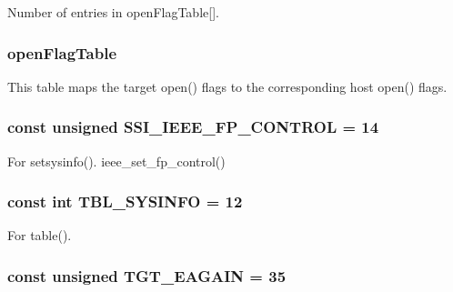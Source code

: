 Number of entries in openFlagTable\mbox{[}\mbox{]}. \hypertarget{classAlphaLinux_ab1db5a531609b99b262cc849ea24765a}{
\subsubsection[{openFlagTable}]{ {\bf openFlagTable}}}
\label{classAlphaLinux_ab1db5a531609b99b262cc849ea24765a}
This table maps the target open() flags to the corresponding host open() flags. \hypertarget{classAlphaLinux_a4dea1885b08c38c78286ecd5ffd5488d}{
\subsubsection[{SSI\_\-IEEE\_\-FP\_\-CONTROL}]{\setlength{\rightskip}{0pt plus 5cm}const unsigned {\bf SSI\_\-IEEE\_\-FP\_\-CONTROL} = 14}}
\label{classAlphaLinux_a4dea1885b08c38c78286ecd5ffd5488d}


For setsysinfo(). ieee\_\-set\_\-fp\_\-control() \hypertarget{classAlphaLinux_a02a979126f2aa34bcdfdc6ab92207d3b}{
\subsubsection[{TBL\_\-SYSINFO}]{\setlength{\rightskip}{0pt plus 5cm}const int {\bf TBL\_\-SYSINFO} = 12}}
\label{classAlphaLinux_a02a979126f2aa34bcdfdc6ab92207d3b}


For table(). \hypertarget{classAlphaLinux_aefc7de6c39dd68b971f1fe2c797acd04}{
\subsubsection[{TGT\_\-EAGAIN}]{\setlength{\rightskip}{0pt plus 5cm}const unsigned {\bf TGT\_\-EAGAIN} = 35}}
\label{classAlphaLinux_aefc7de6c39dd68b971f1fe2c797acd04}


